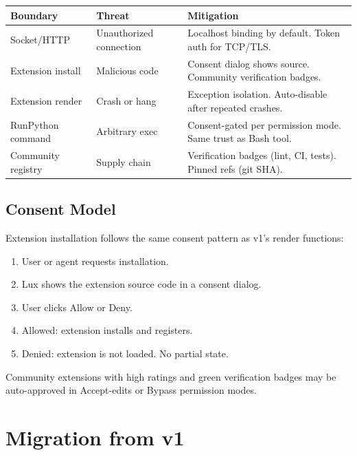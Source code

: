 \documentclass[a4paper,10pt]{article}
\begin{document}
\begin{center}
\begin{tabular}{@{}lp{4cm}p{5cm}@{}}
\toprule
\textbf{Boundary} & \textbf{Threat} & \textbf{Mitigation} \\
\midrule
Socket/HTTP & Unauthorized connection & Localhost binding by
  default.  Token auth for TCP/TLS. \\
Extension install & Malicious code & Consent dialog shows source.
  Community verification badges. \\
Extension render & Crash or hang & Exception isolation.  Auto-disable
  after repeated crashes. \\
RunPython command & Arbitrary exec & Consent-gated per permission
  mode.  Same trust as Bash tool. \\
Community registry & Supply chain & Verification badges (lint, CI,
  tests).  Pinned refs (git SHA). \\
\bottomrule
\end{tabular}
\end{center}

\subsection{Consent Model}

Extension installation follows the same consent pattern as v1's
render functions:

\begin{enumerate}[nosep]
  \item User or agent requests installation.
  \item Lux shows the extension source code in a consent dialog.
  \item User clicks Allow or Deny.
  \item Allowed: extension installs and registers.
  \item Denied: extension is not loaded.  No partial state.
\end{enumerate}

Community extensions with high ratings and green verification
badges may be auto-approved in Accept-edits or Bypass permission
modes.

\section{Migration from v1}
\end{document}
